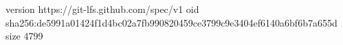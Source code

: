 version https://git-lfs.github.com/spec/v1
oid sha256:de5991a01424f1d4bc02a7fb990820459ce3799c9e3404ef6140a6bf6b7a655d
size 4799
